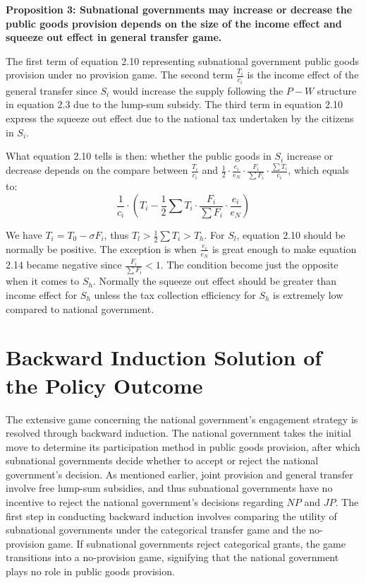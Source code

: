 \begin{itemize}
\textbf{Proposition 3: Subnational governments may increase or decrease the public goods provision depends on the size of the income effect and squeeze out effect in general transfer game.}

The first term of equation 2.10 representing subnational government public goods provision under no provision game. The second term $\frac{T_i}{c_i}$ is the income effect of the general transfer since $S_i$ would increase the supply following the $P-W$ structure in equation 2.3 due to the lump-sum subsidy. The third term in equation 2.10 express the squeeze out effect due to the national tax undertaken by the citizens in $S_i$.

What equation 2.10 tells is then: whether the public goods in $S_i$ increase or decrease depends on the compare between $\frac{T_i}{c_i}$ and $\frac{1}{2} \cdot \frac{e_i}{e_N}\cdot \frac{F_i}{\sum F_i} \cdot \frac{\sum T_i}{c_i}$, which equals to:
\begin{equation}
  \frac{1}{c_i}\cdot (T_i-\frac{1}{2}\sum T_i\cdot \frac{F_i}{\sum F_i}\cdot \frac{e_i}{e_N})
\end{equation}

We have $T_i=T_0 - \sigma F_i$, thus $T_l>\frac{1}{2}\sum T_i >T_h$. For $S_l$, equation 2.10 should be normally be positive. The exception is when $\frac{e_i}{e_N}$ is great enough to make equation 2.14 became negative since $\frac{F_i}{\sum F_i}<1$. The condition become just the opposite when it comes to $S_h$. Normally the squeeze out effect should be greater than income effect for $S_h$ unless the tax collection efficiency for $S_h$ is extremely low compared to national government.

\section{Backward Induction Solution of the Policy Outcome}


The extensive game concerning the national government's engagement strategy is resolved through backward induction. The national government takes the initial move to determine its participation method in public goods provision, after which subnational governments decide whether to accept or reject the national government's decision. As mentioned earlier, joint provision and general transfer involve free lump-sum subsidies, and thus subnational governments have no incentive to reject the national government's decisions regarding $NP$ and $JP$. The first step in conducting backward induction involves comparing the utility of subnational governments under the categorical transfer game and the no-provision game. If subnational governments reject categorical grants, the game transitions into a no-provision game, signifying that the national government plays no role in public goods provision.


\end{itemize}
